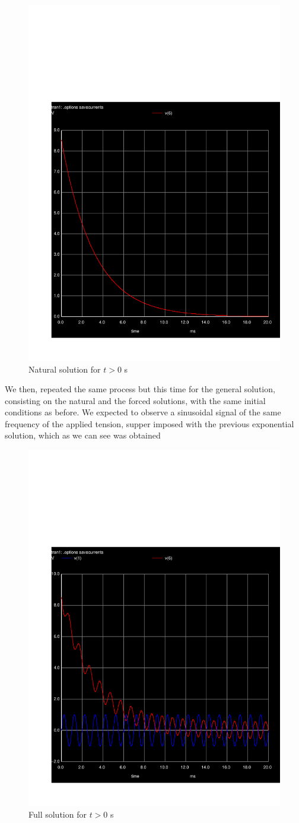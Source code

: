 \begin{figure}[h] \centering
\includegraphics[width=0.6\linewidth]{../sim/3/trans.pdf}
\caption{Natural solution for $t > 0$ s}
\label{fig:Natural solution}
\end{figure}

We then, repeated the same process but this time for the general solution, consisting on the natural and the forced solutions, with the same initial conditions as before. We expected to observe a sinusoidal signal of the same frequency of the applied tension, supper imposed with the previous exponential solution, which as we can see was obtained 


\begin{figure}[h] \centering
\includegraphics[width=0.6\linewidth]{../sim/4/trans.pdf}
\caption{Full solution for $t > 0$ s}
\label{fig:Full solution}
\end{figure}

